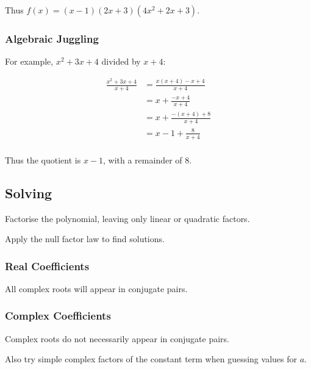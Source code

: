 \documentclass[a4paper,11pt]{article}
\begin{document}
Thus $f(x) = (x - 1)(2x + 3)(4x^2 + 2x + 3)$.


\subsubsection{Algebraic Juggling}

For example, $x^2 + 3x + 4$ divided by $x + 4$:

$$
\begin{aligned}
\frac{x^2 + 3x + 4}{x + 4} & = \frac{x(x + 4) - x + 4}{x + 4} \\
& = x + \frac{-x + 4}{x + 4} \\
& = x + \frac{-(x + 4) + 8}{x + 4} \\
& = x - 1 + \frac{8}{x + 4} \\
\end{aligned}
$$

Thus the quotient is $x - 1$, with a remainder of $8$.


\subsection{Solving}

Factorise the polynomial, leaving only linear or quadratic factors.

Apply the null factor law to find solutions.


\subsubsection{Real Coefficients}

All complex roots will appear in conjugate pairs.


\subsubsection{Complex Coefficients}

Complex roots do not necessarily appear in conjugate pairs.

Also try simple complex factors of the constant term when guessing values for
$a$.
\end{document}
